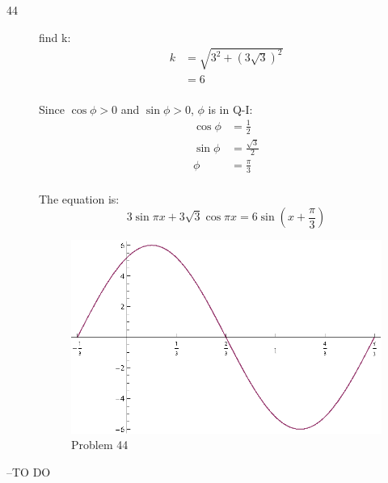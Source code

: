 \documentclass{exam}
\begin{document}
\begin{description}
      \item[44] 
        find k:
        \begin{align*}
          k & = \sqrt{3^2 + (3 \sqrt{3})^2} \\
            & = 6 \\
        \end{align*}

        Since $\cos \phi > 0$ and $\sin \phi > 0$, $\phi$ is in Q-I:
        \begin{align*}
          \cos \phi & = \frac{1}{2} \\
          \sin \phi & = \frac{\sqrt{3}}{2} \\
          \phi      & = \frac{\pi}{3} \\
        \end{align*}

        The equation is:
        \[
          3 \sin \pi x + 3 \sqrt{3} \cos \pi x = \boxed{6 \sin \left( x + \frac{\pi}{3} \right)} 
        \]

        \begin{figure}[H]
          \centering
          \includegraphics[scale=0.8]{problem44.eps}
          \caption{Problem 44}
        \end{figure}

    \end{description}

  \else
    \vspace{5 cm}

    \begin{quote}
      \begin{em}
      \end{em}
    \end{quote}
    \hspace{1 cm} --TO DO
  \fi
\end{document}
